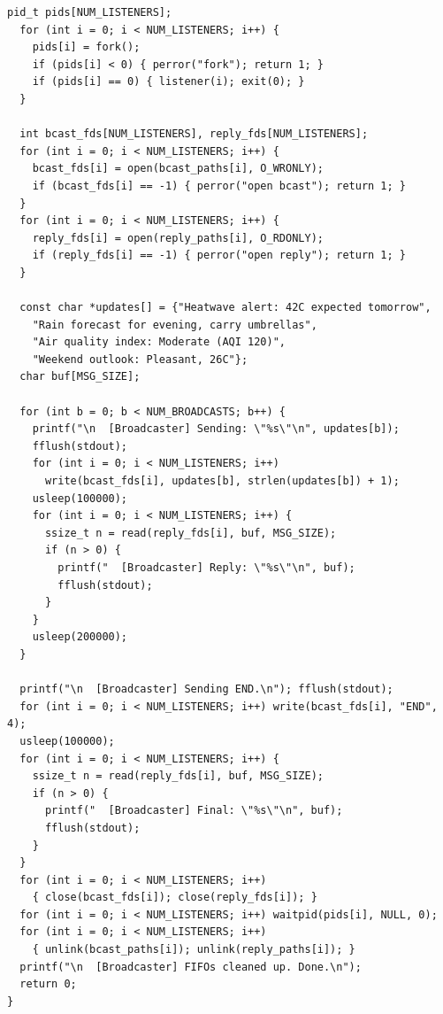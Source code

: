 \documentclass[11pt,a4paper]{article}
\begin{document}
\begin{codebox}
\begin{lstlisting}[style=cstyle]
  pid_t pids[NUM_LISTENERS];
  for (int i = 0; i < NUM_LISTENERS; i++) {
    pids[i] = fork();
    if (pids[i] < 0) { perror("fork"); return 1; }
    if (pids[i] == 0) { listener(i); exit(0); }
  }

  int bcast_fds[NUM_LISTENERS], reply_fds[NUM_LISTENERS];
  for (int i = 0; i < NUM_LISTENERS; i++) {
    bcast_fds[i] = open(bcast_paths[i], O_WRONLY);
    if (bcast_fds[i] == -1) { perror("open bcast"); return 1; }
  }
  for (int i = 0; i < NUM_LISTENERS; i++) {
    reply_fds[i] = open(reply_paths[i], O_RDONLY);
    if (reply_fds[i] == -1) { perror("open reply"); return 1; }
  }

  const char *updates[] = {"Heatwave alert: 42C expected tomorrow",
    "Rain forecast for evening, carry umbrellas",
    "Air quality index: Moderate (AQI 120)",
    "Weekend outlook: Pleasant, 26C"};
  char buf[MSG_SIZE];

  for (int b = 0; b < NUM_BROADCASTS; b++) {
    printf("\n  [Broadcaster] Sending: \"%s\"\n", updates[b]);
    fflush(stdout);
    for (int i = 0; i < NUM_LISTENERS; i++)
      write(bcast_fds[i], updates[b], strlen(updates[b]) + 1);
    usleep(100000);
    for (int i = 0; i < NUM_LISTENERS; i++) {
      ssize_t n = read(reply_fds[i], buf, MSG_SIZE);
      if (n > 0) {
        printf("  [Broadcaster] Reply: \"%s\"\n", buf);
        fflush(stdout);
      }
    }
    usleep(200000);
  }

  printf("\n  [Broadcaster] Sending END.\n"); fflush(stdout);
  for (int i = 0; i < NUM_LISTENERS; i++) write(bcast_fds[i], "END", 4);
  usleep(100000);
  for (int i = 0; i < NUM_LISTENERS; i++) {
    ssize_t n = read(reply_fds[i], buf, MSG_SIZE);
    if (n > 0) {
      printf("  [Broadcaster] Final: \"%s\"\n", buf);
      fflush(stdout);
    }
  }
  for (int i = 0; i < NUM_LISTENERS; i++)
    { close(bcast_fds[i]); close(reply_fds[i]); }
  for (int i = 0; i < NUM_LISTENERS; i++) waitpid(pids[i], NULL, 0);
  for (int i = 0; i < NUM_LISTENERS; i++)
    { unlink(bcast_paths[i]); unlink(reply_paths[i]); }
  printf("\n  [Broadcaster] FIFOs cleaned up. Done.\n");
  return 0;
}
\end{lstlisting}
\end{codebox}
\end{document}
